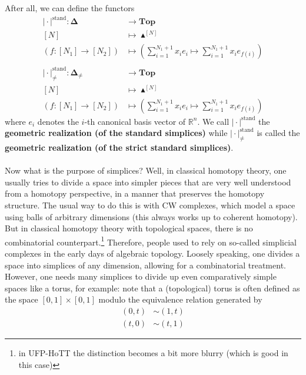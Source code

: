 After all, we can define the functors
\begin{align*}
  \vert
    \cdot
  \vert^{\textrm{stand}}
  \colon
  \mathbf{\Delta}
  &\rightarrow
  \mathbf{Top}
  \\
  [N]
  &\mapsto
  \blacktriangle^{[N]}
  \\
  \left(
    f
    \colon
    [N_{1}]
    \rightarrow
    [N_{2}]
  \right)
  &\mapsto
  \left(
    \sum_{i=1}^{N_{1}+1}
    x_{i}e_{i}
    \mapsto
    \sum_{i=1}^{N_{1}+1}
    x_{i}e_{f(i)}
  \right)
  \\\\
  \vert
    \cdot
  \vert_{\neq}^{\textrm{stand}}
  \colon
  \mathbf{\Delta}_{\neq}
  &\rightarrow
  \mathbf{Top}
  \\
  [N]
  &\mapsto
  \blacktriangle^{[N]}
  \\
  \left(
    f
    \colon
    [N_{1}]
    \rightarrow
    [N_{2}]
  \right)
  &\mapsto
  \left(
    \sum_{i=1}^{N_{1}+1}
    x_{i}e_{i}
    \mapsto
    \sum_{i=1}^{N_{1}+1}
    x_{i}e_{f(i)}
  \right)
\end{align*}
where $e_{i}$ denotes the $i$-th canonical basis vector of $\mathbb{R}^{n}$.
We call $\vert \cdot \vert^{\textrm{stand}}$ the \textbf{geometric realization (of the standard simplices)} while $\vert \cdot \vert_{\neq}^{\textrm{stand}}$ is called the \textbf{geometric realization (of the strict standard simplices)}.
\\\\
Now what is the purpose of simplices? Well, in classical homotopy theory, one usually tries to divide a space into simpler pieces that are very well understood from a homotopy perspective, in a manner that preserves the homotopy structure.
The usual way to do this is with CW complexes, which model a space using balls of arbitrary dimensions (this always works up to coherent homotopy).
But in classical homotopy theory with topological spaces, there is no combinatorial counterpart.\footnote{in UFP-HoTT the distinction becomes a bit more blurry (which is good in this case)}
Therefore, people used to rely on so-called simplicial complexes in the early days of algebraic topology.
Loosely speaking, one divides a space into simplices of any dimension, allowing for a combinatorial treatment.
However, one needs many simplices to divide up even comparatively simple spaces like a torus, for example: note that a (topological) torus is often defined as the space $[0,1] \times [0,1]$ modulo the equivalence relation generated by
\begin{align*}
  (0,t)
  &\sim
  (1,t)
  \\
  (t,0)
  &\sim
  (t,1)
\end{align*}
